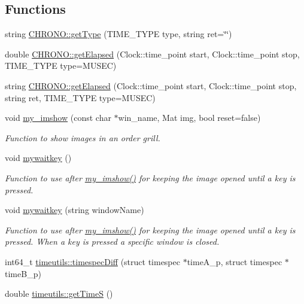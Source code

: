 \subsection*{Functions}
\begin{DoxyCompactItemize}
\item 
string \mbox{\hyperlink{namespace_c_h_r_o_n_o_ae2a3e41f8bf5f83ba84d3f4d2eed3836}{C\+H\+R\+O\+N\+O\+::get\+Type}} (T\+I\+M\+E\+\_\+\+T\+Y\+PE type, string ret=\char`\"{}\char`\"{})
\item 
double \mbox{\hyperlink{namespace_c_h_r_o_n_o_aebe2329c142a6f06b6fede41c3abf1b3}{C\+H\+R\+O\+N\+O\+::get\+Elapsed}} (Clock\+::time\+\_\+point start, Clock\+::time\+\_\+point stop, T\+I\+M\+E\+\_\+\+T\+Y\+PE type=M\+U\+S\+EC)
\item 
string \mbox{\hyperlink{namespace_c_h_r_o_n_o_ad8da7180c420d59f4c0077b60579c0ae}{C\+H\+R\+O\+N\+O\+::get\+Elapsed}} (Clock\+::time\+\_\+point start, Clock\+::time\+\_\+point stop, string ret, T\+I\+M\+E\+\_\+\+T\+Y\+PE type=M\+U\+S\+EC)
\item 
void \mbox{\hyperlink{utils_8hh_aabfea83501dfccfa4c420b8c19ceefd7}{my\+\_\+imshow}} (const char $\ast$win\+\_\+name, Mat img, bool reset=false)
\begin{DoxyCompactList}\small\item\em Function to show images in an order grill. \end{DoxyCompactList}\item 
void \mbox{\hyperlink{utils_8hh_abcbca5e81e43b340e78e92d29108d4e5}{mywaitkey}} ()
\begin{DoxyCompactList}\small\item\em Function to use after \mbox{\hyperlink{utils_8hh_aabfea83501dfccfa4c420b8c19ceefd7}{my\+\_\+imshow()}} for keeping the image opened until a key is pressed. \end{DoxyCompactList}\item 
void \mbox{\hyperlink{utils_8hh_a31ae190fba03c3a422a13a4271e0e424}{mywaitkey}} (string window\+Name)
\begin{DoxyCompactList}\small\item\em Function to use after \mbox{\hyperlink{utils_8hh_aabfea83501dfccfa4c420b8c19ceefd7}{my\+\_\+imshow()}} for keeping the image opened until a key is pressed. When a key is pressed a specific window is closed. \end{DoxyCompactList}\item 
int64\+\_\+t \mbox{\hyperlink{namespacetimeutils_a3d9d509a7028cffae8aef9c70f6c2c52}{timeutils\+::timespec\+Diff}} (struct timespec $\ast$time\+A\+\_\+p, struct timespec $\ast$time\+B\+\_\+p)
\item 
double \mbox{\hyperlink{namespacetimeutils_aa732b7f41462ff727daef77bd5030b9c}{timeutils\+::get\+TimeS}} ()
\end{DoxyCompactItemize}


